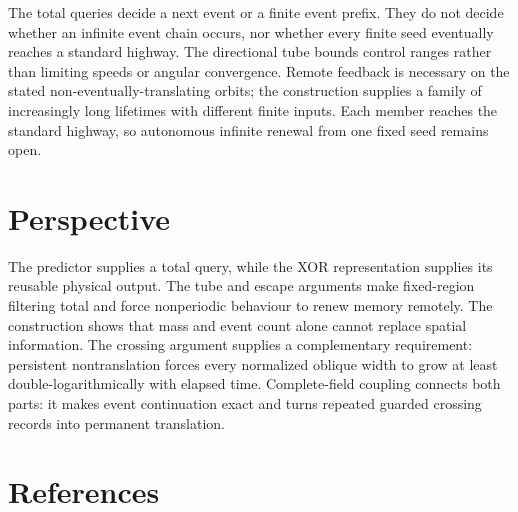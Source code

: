 \documentclass[
  11pt,
]{article}
\begin{document}
The total queries decide a next event or a finite event prefix. They do
not decide whether an infinite event chain occurs, nor whether every
finite seed eventually reaches a standard highway. The directional tube
bounds control ranges rather than limiting speeds or angular convergence.
Remote feedback is necessary on the stated non-eventually-translating
orbits; the construction supplies a family of increasingly long lifetimes
with different finite inputs. Each member reaches the standard highway,
so autonomous infinite renewal from one fixed seed remains open.

\clearpage
\section{Perspective}

The predictor supplies a total query, while the XOR representation
supplies its reusable physical output. The tube and escape arguments
make fixed-region filtering total and force nonperiodic behaviour to
renew memory remotely. The construction shows that mass and event count
alone cannot replace spatial information. The crossing argument supplies a
complementary requirement: persistent nontranslation forces every normalized
oblique width to grow at least double-logarithmically with elapsed time.
Complete-field coupling connects both parts: it makes event continuation exact
and turns repeated guarded crossing records into permanent translation.

\section{References}\label{references}
\end{document}
